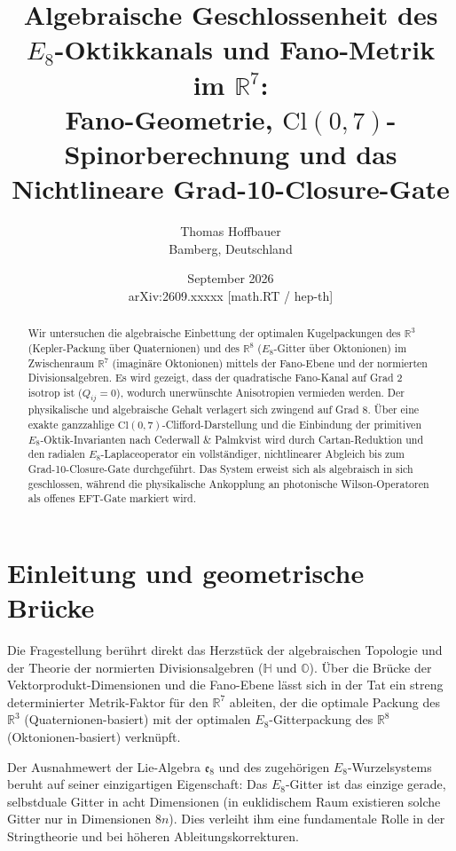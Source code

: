 \documentclass[11pt,a4paper]{article}
\title{\textbf{Algebraische Geschlossenheit des $E_8$-Oktikkanals und Fano-Metrik im $\mathbb{R}^7$:\\Fano-Geometrie, $\text{Cl}(0,7)$-Spinorberechnung und das Nichtlineare Grad-10-Closure-Gate}}
\author{Thomas Hoffbauer \\ \small Bamberg, Deutschland}
\date{September 2026 \\[1ex] \small arXiv:2609.xxxxx [math.RT / hep-th]}
\begin{document}
\maketitle

\begin{abstract}
Wir untersuchen die algebraische Einbettung der optimalen Kugelpackungen des $\mathbb{R}^3$ (Kepler-Packung über Quaternionen) und des $\mathbb{R}^8$ ($E_8$-Gitter über Oktonionen) im Zwischenraum $\mathbb{R}^7$ (imaginäre Oktonionen) mittels der Fano-Ebene und der normierten Divisionsalgebren. Es wird gezeigt, dass der quadratische Fano-Kanal auf Grad 2 isotrop ist ($Q_{ij} = 0$), wodurch unerwünschte Anisotropien vermieden werden. Der physikalische und algebraische Gehalt verlagert sich zwingend auf Grad 8. Über eine exakte ganzzahlige $\text{Cl}(0,7)$-Clifford-Darstellung und die Einbindung der primitiven $E_8$-Oktik-Invarianten nach Cederwall \& Palmkvist wird durch Cartan-Reduktion und den radialen $E_8$-Laplaceoperator ein vollständiger, nichtlinearer Abgleich bis zum Grad-10-Closure-Gate durchgeführt. Das System erweist sich als algebraisch in sich geschlossen, während die physikalische Ankopplung an photonische Wilson-Operatoren als offenes EFT-Gate markiert wird.
\end{abstract}

\section{Einleitung und geometrische Brücke}
Die Fragestellung berührt direkt das Herzstück der algebraischen Topologie und der Theorie der normierten Divisionsalgebren ($\mathbb{H}$ und $\mathbb{O}$). Über die Brücke der Vektorprodukt-Dimensionen und die Fano-Ebene lässt sich in der Tat ein streng determinierter Metrik-Faktor für den $\mathbb{R}^7$ ableiten, der die optimale Packung des $\mathbb{R}^3$ (Quaternionen-basiert) mit der optimalen $E_8$-Gitterpackung des $\mathbb{R}^8$ (Oktonionen-basiert) verknüpft.

Der Ausnahmewert der Lie-Algebra $\mathfrak{e}_8$ und des zugehörigen $E_8$-Wurzelsystems beruht auf seiner einzigartigen Eigenschaft: Das $E_8$-Gitter ist das einzige gerade, selbstduale Gitter in acht Dimensionen (in euklidischem Raum existieren solche Gitter nur in Dimensionen $8n$). Dies verleiht ihm eine fundamentale Rolle in der Stringtheorie und bei höheren Ableitungskorrekturen.
\end{document}
